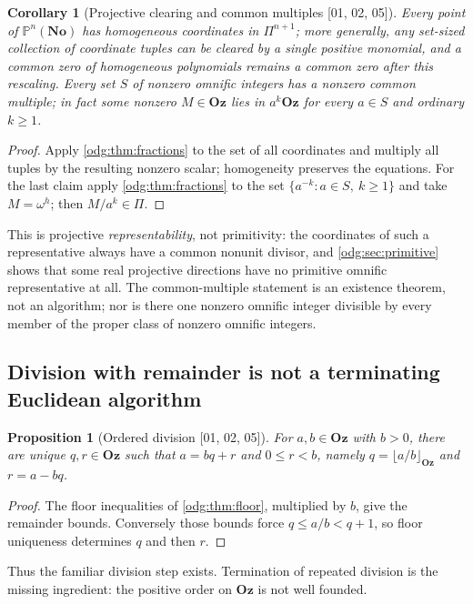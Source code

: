 \documentclass[11pt,oneside]{article}
\numberwithin{equation}{section}
\newtheorem{proposition}[proposition]{Proposition}
\newtheorem{corollary}[corollary]{Corollary}
\theoremstyle{definition}
\theoremstyle{remark}
\newcommand{\No}{\mathbf{No}}
\newcommand{\Oz}{\mathbf{Oz}}
\newcommand{\src}[1]{\textup{\textsf{\small[#1]}}}
\begin{document}
\begin{corollary}[Projective clearing and common multiples \src{01, 02, 05}]\label{odg:cor:projectiveclear}\label{odg:cor:commonmultiples}
Every point of $\mathbb P^n(\No)$ has homogeneous coordinates in
$\Pi^{n+1}$; more generally, any set-sized collection of coordinate tuples
can be cleared by a single positive monomial, and a common zero of
homogeneous polynomials remains a common zero after this rescaling. Every
set $S$ of nonzero omnific integers has a nonzero common multiple; in fact
some nonzero $M\in\Oz$ lies in $a^k\Oz$ for every $a\in S$ and ordinary
$k\ge1$.
\end{corollary}
\begin{proof}
Apply \cref{odg:thm:fractions} to the set of all coordinates and multiply
all tuples by the resulting nonzero scalar; homogeneity preserves the
equations. For the last claim apply \cref{odg:thm:fractions} to the set
$\{a^{-k}:a\in S,\ k\ge1\}$ and take $M=\omega^h$; then $M/a^k\in\Pi$.
\end{proof}

This is projective \emph{representability}, not primitivity: the coordinates
of such a representative always have a common nonunit divisor, and
\cref{odg:sec:primitive} shows that some real projective directions have no
primitive omnific representative at all. The common-multiple statement is an
existence theorem, not an algorithm; nor is there one nonzero omnific integer
divisible by every member of the proper class of nonzero omnific integers.

\subsection{Division with remainder is not a terminating Euclidean algorithm}

\begin{proposition}[Ordered division \src{01, 02, 05}]\label{odg:prop:division}
For $a,b\in\Oz$ with $b>0$, there are unique $q,r\in\Oz$ such that
$a=bq+r$ and $0\leq r<b$, namely $q=\lfloor a/b\rfloor_{\Oz}$ and
$r=a-bq$.
\end{proposition}
\begin{proof}
The floor inequalities of \cref{odg:thm:floor}, multiplied by $b$, give the
remainder bounds. Conversely those bounds force $q\leq a/b<q+1$, so floor
uniqueness determines $q$ and then $r$.
\end{proof}

Thus the familiar division step exists. Termination of repeated division
is the missing ingredient: the positive order on $\Oz$ is not well founded.
\end{document}
